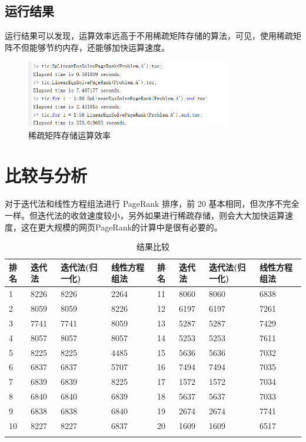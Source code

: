 \documentclass[a4paper,left=2.5cm,right=2.5cm]{article}
\begin{document}
\begin{spacing}{1.6}
	\subsection{运行结果}
	运行结果可以发现，运算效率远高于不用稀疏矩阵存储的算法，可见，使用稀疏矩阵不但能够节约内存，还能够加快运算速度。
	\begin{figure}[H]
		\includegraphics[width=0.8\textwidth]{image/result_sp1.png}
		\caption{稀疏矩阵存储运算效率}
	\end{figure}
	\section{比较与分析}
	对于迭代法和线性方程组法进行 PageRank 排序，前 20 基本相同，但次序不完全一样。但迭代法的收敛速度较小，另外如果进行稀疏存储，则会大大加快运算速度，这在更大规模的网页PageRank的计算中是很有必要的。
	\begin{longtable}{|llll||llll|}
		\hline
		排名&迭代法&迭代法(归一化) & 线性方程组法& 排名&迭代法&迭代法(归一化)&线性方程组法\\
		\hline
		1	&	8226	&	8226		&	2264	&	11	&	8060	&	8060	&	6838	\\
		2	&	8059	&	8059		&	8226	&	12	&	6197	&	6197	&	7261	\\
		3	&	7741	&	7741		&	8059	&	13	&	5287	&	5287	&	7429	\\
		4	&	8057	&	8057		&	8057	&	14	&	5253	&	5253	&	7611	\\
		5	&	8225	&	8225		&	4485	&	15	&	5636	&	5636	&	7032	\\
		6	&	6837	&	6837		&	5707	&	16	&	7494	&	7494	&	7035	\\
		7	&	6839	&	6839		&	8225	&	17	&	1572	&	1572	&	7034	\\
		8	&	6840	&	6840		&	6839	&	18	&	5637	&	5637	&	7033	\\
		9	&	6838	&	6838		&	6840	&	19	&	2674	&	2674	&	7741	\\
		10	&	8227	&	8227		&	6837	&	20	&	1609	&	1609	&	6517	\\
		
		\hline
		\caption{结果比较}
	\end{longtable}
	\end{spacing}
	
\end{document}
